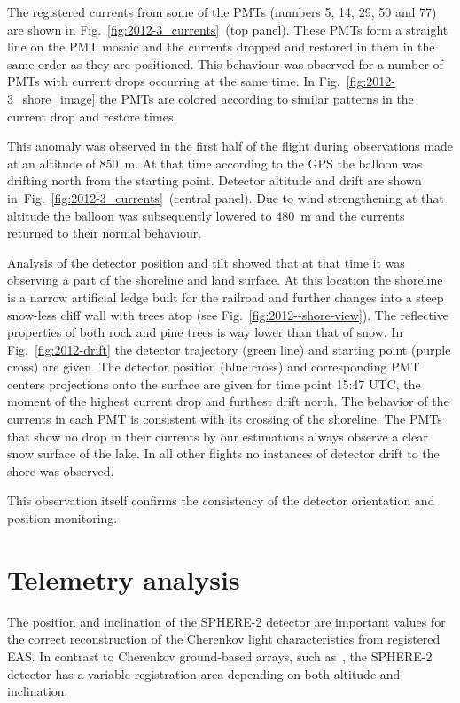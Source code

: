 \documentclass[final,5p,times,twocolumn]{elsarticle}
\begin{document}
The registered currents from some of the PMTs (numbers 5, 14, 29, 50 and 77) are shown in Fig.~\ref{fig:2012-3_currents}~(top panel). These PMTs form a straight line on the PMT mosaic and the currents dropped and restored in them in the same order as they are positioned. This behaviour was observed for a number of PMTs with current drops occurring at the same time. In Fig.~\ref{fig:2012-3_shore_image} the PMTs are colored according to similar patterns in the current drop and restore times.

This anomaly was observed in the first half of the flight during observations made at an altitude of 850~m. At that time according to the GPS the balloon was drifting north from the starting point. Detector altitude and drift are shown in~Fig.~\ref{fig:2012-3_currents}~(central panel). Due to wind strengthening at that altitude the balloon was subsequently lowered to 480~m and the currents returned to their normal behaviour. 

Analysis of the detector position and tilt showed that at that time it was observing a part of the shoreline and land surface. At this location the shoreline is a narrow artificial ledge built for the railroad and further changes into a steep snow-less cliff wall with trees atop (see Fig.~\ref{fig:2012--shore-view}). The reflective properties of both rock and pine trees is way lower than that of snow. In Fig.~\ref{fig:2012-drift} the detector trajectory (green line) and starting point (purple cross) are given. The detector position (blue cross) and corresponding PMT centers projections onto the surface are given for time point 15:47 UTC, the moment of the highest current drop and furthest drift north. The behavior of the currents in each PMT is consistent with its crossing of the shoreline. The PMTs that show no drop in their currents by our estimations always observe a clear snow surface of the lake. In all other flights no instances of detector drift to the shore was observed.

This observation itself confirms the consistency of the detector orientation and position monitoring.

\section{Telemetry analysis}

The position and inclination of the SPHERE-2 detector are important values for the correct reconstruction of the Cherenkov light characteristics from registered EAS. In contrast to Cherenkov ground-based arrays, such as~\cite{Yakutsk19,TUNKA133}, the SPHERE-2 detector has a variable registration area depending on both altitude and inclination.
\end{document}

